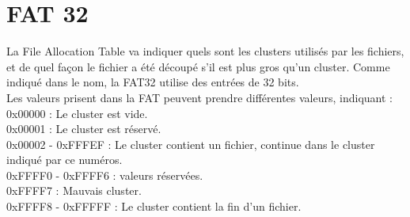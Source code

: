 \documentclass[11pt]{report}
\begin{document}
\section{FAT 32}
La File Allocation Table va indiquer quels sont les clusters utilisés par les fichiers, et de quel façon le fichier a été découpé s'il est plus gros qu'un cluster.
Comme indiqué dans le nom, la FAT32 utilise des entrées de 32 bits.\\
Les valeurs prisent dans la FAT peuvent prendre différentes valeurs, indiquant : \\
0x00000 : Le cluster est vide.\\
0x00001 : Le cluster est réservé.\\
0x00002 - 0xFFFEF : Le cluster contient un fichier, continue dans le cluster indiqué par ce numéros.\\
0xFFFF0 - 0xFFFF6 : valeurs réservées.\\
0xFFFF7 : Mauvais cluster.\\
0xFFFF8 - 0xFFFFF : Le cluster contient la fin d'un fichier.\\
\end{document}
